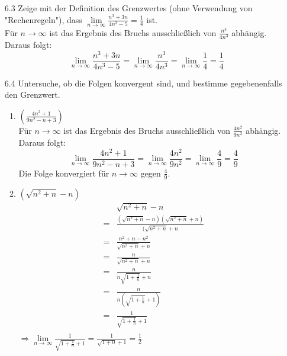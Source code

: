\documentclass{HM}
\begin{document}
\newcommand\rcancel[1]{\renewcommand\CancelColor{\color{red}}\cancel{#1}}
\newcommand\gcancel[1]{\renewcommand\CancelColor{\color{green}}\cancel{#1}}
\newcommand\dcancel[1]{\renewcommand\CancelColor{\color{black}}\cancel{#1}}
\begin{enumerate}
	\item[6.3] Zeige mit der Definition des Grenzwertes (ohne Verwendung von "Rechenregeln"), dass $\lim\limits_{n\to\infty}\frac{n^3+3n}{4n^3-5}=\frac{1}{4}$ ist.\\
	Für $n\to\infty$ ist das Ergebnis des Bruchs ausschließlich von $\frac{n^3}{4n^3}$ abhängig. Daraus folgt:\\
	$$\lim\limits_{n\to\infty}\frac{n^3+3n}{4n^3-5}=\lim\limits_{n\to\infty}\frac{n^3}{4n^3}=\lim\limits_{n\to\infty}\frac{1}{4}=\frac{1}{4}$$
	\item[6.4] Untersuche, ob die Folgen konvergent sind, und bestimme gegebenenfalls den Grenzwert.
	\begin{enumerate}
		\item $\left(\frac{4n^2+1}{9n^2-n+3}\right)$\\
		Für $n\to\infty$ ist das Ergebnis des Bruchs ausschließlich von $\frac{4n^2}{9n^2}$ abhängig. Daraus folgt:\\
		$$\lim\limits_{n\to\infty}\frac{4n^2+1}{9n^2-n+3}
		=\lim\limits_{n\to\infty}\frac{4n^2}{9n^2}
		=\lim\limits_{n\to\infty}\frac{4}{9}
		=\frac{4}{9}$$
		Die Folge konvergiert für $n\to\infty$ gegen $\frac{4}{9}$.
		
		\item $\left(\sqrt{n^2+n}-n\right)$\\
		\begin{align*}
		&\sqrt{n^2+n}-n\\
		=&\frac{(\sqrt{n^2+n}-n)(\sqrt{n^2+n}+n)}{(\sqrt{n^2+n}+n}\\
		=&\frac{n^2+n-n^2}{\sqrt{n^2+n}+n}\\
		=&\frac{n}{\sqrt{n^2+n}+n}\\
		=&\frac{n}{n\sqrt{1+\frac{1}{n}}+n}\\
		=&\frac{n}{n(\sqrt{1+\frac{1}{n}}+1)}\\
		=&\frac{1}{\sqrt{1+\frac{1}{n}}+1}\\
		\end{align*}
		$\Rightarrow \lim\limits_{n\to\infty}\frac{1}{\sqrt{1+\frac{1}{n}}+1} = \frac{1}{\sqrt{1+0}+1} =  \frac{1}{2}$\\\\
		

\end{enumerate}
\end{enumerate}
\end{document}
